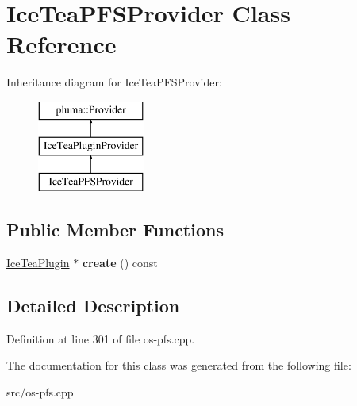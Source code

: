 \hypertarget{class_ice_tea_p_f_s_provider}{}\section{Ice\+Tea\+P\+F\+S\+Provider Class Reference}
\label{class_ice_tea_p_f_s_provider}
Inheritance diagram for Ice\+Tea\+P\+F\+S\+Provider\+:\begin{figure}[H]
\begin{center}
\leavevmode
\includegraphics[height=3.000000cm]{class_ice_tea_p_f_s_provider}
\end{center}
\end{figure}
\subsection*{Public Member Functions}
\begin{DoxyCompactItemize}
\item 
\hyperlink{class_ice_tea_plugin}{Ice\+Tea\+Plugin} $\ast$ {\bfseries create} () const \hypertarget{class_ice_tea_p_f_s_provider_ac668ab64b87e8a006a87e6782347ceb6}{}\label{class_ice_tea_p_f_s_provider_ac668ab64b87e8a006a87e6782347ceb6}

\end{DoxyCompactItemize}


\subsection{Detailed Description}


Definition at line 301 of file os-\/pfs.\+cpp.



The documentation for this class was generated from the following file\+:\begin{DoxyCompactItemize}
\item 
src/os-\/pfs.\+cpp\end{DoxyCompactItemize}
